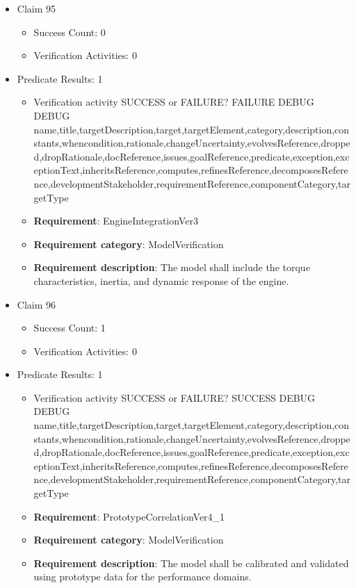 \documentclass{article}
\begin{document}
\begin{itemize}
  				  \item Claim 95
				\begin{itemize}
			    	\item Success Count: 0 
			    	\item Verification Activities: 0
				\end{itemize}
				
									    
				\item Predicate Results: 1
					\begin{itemize}				
					\item Verification activity SUCCESS or FAILURE? FAILURE
					DEBUG DEBUG name,title,targetDescription,target,targetElement,category,description,constants,whencondition,rationale,changeUncertainty,evolvesReference,dropped,dropRationale,docReference,issues,goalReference,predicate,exception,exceptionText,inheritsReference,computes,refinesReference,decomposesReference,developmentStakeholder,requirementReference,componentCategory,targetType
					\item \textbf{Requirement}: EngineIntegrationVer3 
					\item \textbf{Requirement category}: ModelVerification
					\item \textbf{Requirement description}: The model shall include the torque characteristics, inertia, and dynamic response of the engine.
					\end{itemize}

  				  \item Claim 96
				\begin{itemize}
			    	\item Success Count: 1 
			    	\item Verification Activities: 0
				\end{itemize}
				
									    
				\item Predicate Results: 1
					\begin{itemize}				
					\item Verification activity SUCCESS or FAILURE? SUCCESS
					DEBUG DEBUG name,title,targetDescription,target,targetElement,category,description,constants,whencondition,rationale,changeUncertainty,evolvesReference,dropped,dropRationale,docReference,issues,goalReference,predicate,exception,exceptionText,inheritsReference,computes,refinesReference,decomposesReference,developmentStakeholder,requirementReference,componentCategory,targetType
					\item \textbf{Requirement}: PrototypeCorrelationVer4_1 
					\item \textbf{Requirement category}: ModelVerification
					\item \textbf{Requirement description}: The model shall be calibrated and validated using prototype data for the performance domains.
					\end{itemize}


\end{itemize}
\end{document}
